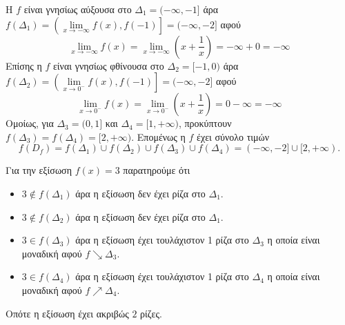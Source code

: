 \documentclass[a4paper,11pt,twoside]{article}
\begin{document}
\begin{alist}[start=3]
\item Η $f$ είναι γνησίως αύξουσα στο $\varDelta_1=(-\infty,-1]$ άρα $f(\varDelta_1)=\left(\lim\limits_{x\to-\infty}{f(x)},f(-1)\right]=(-\infty,-2]$ αφού
\[ \lim_{x\to -\infty}{f(x)}=\lim_{x\to-\infty}{\left(x+\frac{1}{x}\right)}=-\infty+0=-\infty \]
Επίσης η $f$ είναι γνησίως φθίνουσα στο $\varDelta_2=[-1,0)$ άρα $f(\varDelta_2)=\left(\lim\limits_{x\to0^-}{f(x)},f(-1)\right]=(-\infty,-2]$ αφού
\[ \lim_{x\to0^-}{f(x)}=\lim_{x\to0^-}{\left(x+\frac{1}{x}\right)}=0-\infty=-\infty \]
Ομοίως, για $\varDelta_3=(0,1]$ και $\varDelta_4=[1,+\infty)$, προκύπτουν $f(\varDelta_3)=f(\varDelta_4)=[2,+\infty)$. Επομένως η $f$ έχει σύνολο τιμών
\[f(D_f)=f(\varDelta_1)\cup f(\varDelta_2)\cup f(\varDelta_3)\cup f(\varDelta_4)=(-\infty,-2]\cup[2,+\infty).\]
\item Για την εξίσωση $f(x)=3$ παρατηρούμε ότι 
\begin{itemize}
\item $3\notin f(\varDelta_1)$ άρα η εξίσωση δεν έχει ρίζα στο $\varDelta_1$.
\item $3\notin f(\varDelta_2)$ άρα η εξίσωση δεν έχει ρίζα στο $\varDelta_1$.
\item $3\in f(\varDelta_3)$ άρα η εξίσωση έχει τουλάχιστον 1 ρίζα στο $\varDelta_3$ η οποία είναι μοναδική αφού $f\searrow\varDelta_3$.
\item $3\in f(\varDelta_4)$ άρα η εξίσωση έχει τουλάχιστον 1 ρίζα στο $\varDelta_4$ η οποία είναι μοναδική αφού $f\nearrow\varDelta_4$.
\end{itemize}
Οπότε η εξίσωση έχει ακριβώς $2$ ρίζες.
\end{alist}
\end{document}
